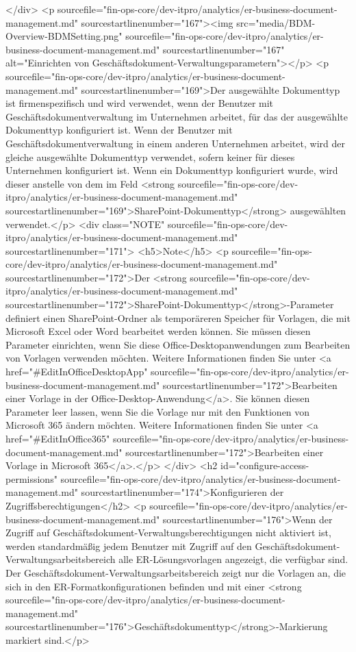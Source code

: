 </div>
<p sourcefile="fin-ops-core/dev-itpro/analytics/er-business-document-management.md" sourcestartlinenumber="167"><img src="media/BDM-Overview-BDMSetting.png" sourcefile="fin-ops-core/dev-itpro/analytics/er-business-document-management.md" sourcestartlinenumber="167" alt="Einrichten von Geschäftsdokument-Verwaltungsparametern"></p>
<p sourcefile="fin-ops-core/dev-itpro/analytics/er-business-document-management.md" sourcestartlinenumber="169">Der ausgewählte Dokumenttyp ist firmenspezifisch und wird verwendet, wenn der Benutzer mit Geschäftsdokumentverwaltung im Unternehmen arbeitet, für das der ausgewählte Dokumenttyp konfiguriert ist. Wenn der Benutzer mit Geschäftsdokumentverwaltung in einem anderen Unternehmen arbeitet, wird der gleiche ausgewählte Dokumenttyp verwendet, sofern keiner für dieses Unternehmen konfiguriert ist. Wenn ein Dokumenttyp konfiguriert wurde, wird dieser anstelle von dem im Feld <strong sourcefile="fin-ops-core/dev-itpro/analytics/er-business-document-management.md" sourcestartlinenumber="169">SharePoint-Dokumenttyp</strong> ausgewählten verwendet.</p>
<div class="NOTE" sourcefile="fin-ops-core/dev-itpro/analytics/er-business-document-management.md" sourcestartlinenumber="171">
<h5>Note</h5>
<p sourcefile="fin-ops-core/dev-itpro/analytics/er-business-document-management.md" sourcestartlinenumber="172">Der <strong sourcefile="fin-ops-core/dev-itpro/analytics/er-business-document-management.md" sourcestartlinenumber="172">SharePoint-Dokumenttyp</strong>-Parameter definiert einen SharePoint-Ordner als temporäreren Speicher für Vorlagen, die mit Microsoft Excel oder Word bearbeitet werden können. Sie müssen diesen Parameter einrichten, wenn Sie diese Office-Desktopanwendungen zum Bearbeiten von Vorlagen verwenden möchten. Weitere Informationen finden Sie unter <a href="#EditInOfficeDesktopApp" sourcefile="fin-ops-core/dev-itpro/analytics/er-business-document-management.md" sourcestartlinenumber="172">Bearbeiten einer Vorlage in der Office-Desktop-Anwendung</a>. Sie können diesen Parameter leer lassen, wenn Sie die Vorlage nur mit den Funktionen von Microsoft 365 ändern möchten. Weitere Informationen finden Sie unter <a href="#EditInOffice365" sourcefile="fin-ops-core/dev-itpro/analytics/er-business-document-management.md" sourcestartlinenumber="172">Bearbeiten einer Vorlage in Microsoft 365</a>.</p>
</div>
<h2 id="configure-access-permissions" sourcefile="fin-ops-core/dev-itpro/analytics/er-business-document-management.md" sourcestartlinenumber="174">Konfigurieren der Zugriffsberechtigungen</h2>
<p sourcefile="fin-ops-core/dev-itpro/analytics/er-business-document-management.md" sourcestartlinenumber="176">Wenn der Zugriff auf Geschäftsdokument-Verwaltungsberechtigungen nicht aktiviert ist, werden standardmäßig jedem Benutzer mit Zugriff auf den Geschäftsdokument-Verwaltungsarbeitsbereich alle ER-Lösungsvorlagen angezeigt, die verfügbar sind. Der Geschäftsdokument-Verwaltungsarbeitsbereich zeigt nur die Vorlagen an, die sich in den ER-Formatkonfigurationen befinden und mit einer <strong sourcefile="fin-ops-core/dev-itpro/analytics/er-business-document-management.md" sourcestartlinenumber="176">Geschäftsdokumenttyp</strong>-Markierung markiert sind.</p>
